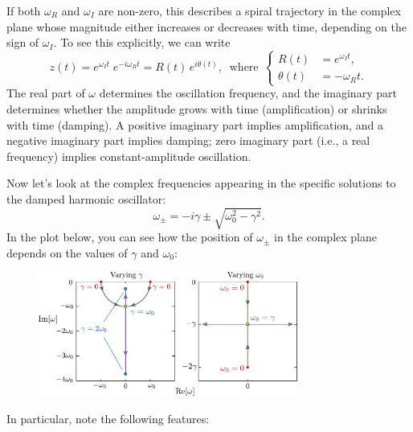\documentclass[10pt,a4paper]{article}
\begin{document}
If both $\omega_R$ and $\omega_I$ are non-zero, this describes a
spiral trajectory in the complex plane whose magnitude either
increases or decreases with time, depending on the sign of
$\omega_I$. To see this explicitly, we can write
\begin{equation}
z(t) = e^{\omega_I t} \; e^{-i\omega_R t} = R(t)\, e^{i\theta(t)}, \;\;\mathrm{where}\;\,\begin{cases}\displaystyle R(t) &= e^{\omega_I t}, \\ \displaystyle \theta(t) &= -\omega_R t.\end{cases}
\end{equation}
The real part of $\omega$ determines the oscillation frequency, and
the imaginary part determines whether the amplitude grows with time
(amplification) or shrinks with time (damping). A positive imaginary
part implies amplification, and a negative imaginary part implies
damping; zero imaginary part (i.e., a real frequency) implies
constant-amplitude oscillation.

Now let's look at the complex frequencies appearing in the specific
solutions to the damped harmonic oscillator:
\begin{equation}
\omega_\pm = -i\gamma \pm \sqrt{\omega_0^2 - \gamma^2}.
\end{equation}
In the plot below, you can see how the position of $\omega_\pm$ in the
complex plane depends on the values of $\gamma$ and $\omega_0$:

\begin{figure}[ht]
  \centering\includegraphics[width=0.76\textwidth]{oscillator_frequencies}
\end{figure}

\clearpage
In particular, note the following features:
\end{document}
